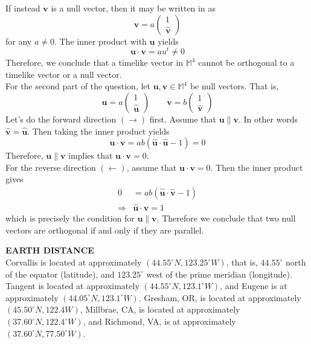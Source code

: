 \documentclass[a4paper, 11pt]{article}
\newcommand{\M}{\mathbb{M}}
\newcommand{\unit}[1]{\hat{\boldsymbol{#1}}}
\newcommand{\threevec}[2]{\begin{pmatrix} #1 \\ #2 \end{pmatrix}}
\newenvironment{solution}{%
	\begin{list}{}{%
			\setlength{\topsep}{0pt}%
			\setlength{\leftmargin}{0.5cm}%
			\setlength{\rightmargin}{0.5cm}%
			\setlength{\listparindent}{\parindent}%
			\setlength{\itemindent}{\parindent}%
			\setlength{\parsep}{\parskip}%
		}%
		\item[]}{\end{list}}
\begin{document}
\begin{enumerate}[leftmargin=0em, label=\textbf{\arabic*}]
\begin{solution}
      If instead $\mathbf{v}$ is a null vector, then it may be written in as
      \begin{equation}
        \mathbf{v} = a\threevec{1}{\unit{v}}
      \end{equation}
      for any $a\neq 0$. The inner product with $\mathbf{u}$ yields
      \begin{equation}
        \mathbf{u}\cdot\mathbf{v} = au^t \neq 0 
      \end{equation}
      Therefore, we conclude that a timelike vector in $\M^4$ cannot be
      orthogonal to a timelike vector or a null vector.\\

      For the second part of the question, let $\mathbf{u},\mathbf{v}\in \M^4$
      be null vectors. That is,
      \begin{equation}
        \mathbf{u}=a\threevec{1}{\unit{u}} \qquad \mathbf{v}= b\threevec{1}{\unit{v}}
      \end{equation}
      Let's do the forward direction $(\rightarrow)$ first. Assume that
      $\mathbf{u}\parallel\mathbf{v}$. In other words $\unit{v}=\unit{u}$. Then
      taking the inner product yields
      \begin{equation}
        \mathbf{u}\cdot\mathbf{v} = ab(\unit{u}\cdot\unit{u}-1) = 0 
      \end{equation}
     Therefore, $\mathbf{u}\parallel\mathbf{v}$  implies that
     $\mathbf{u}\cdot\mathbf{v}=0$.\\

     For the reverse direction $(\leftarrow)$, assume that
     $\mathbf{u}\cdot\mathbf{v}=0$. Then the inner product gives
     \begin{align}
       0 &= ab(\unit{u}\cdot\unit{v}-1) \\
       \Rightarrow &\unit{u}\cdot\unit{v} = 1 
     \end{align}
     which is precisely the condition for $\mathbf{u}\parallel\mathbf{v}$.
     Therefore we conclude that two null vectors are orthogonal if and only if
     they are parallel. 
        
      
    \end{solution}
    

  \item \textbf{EARTH DISTANCE}\\
    Corvallis is located at approximately $(44.55^\circ N, 123.25^\circ W)$,
    that is, $44.55^\circ$ north of the equator (latitude), and $123.25^\circ$
    west of the prime meridian (longitude). Tangent is located at approximately
    $(44.55^\circ N, 123.1^\circ W)$, and Eugene is at approximately
    $(44.05^\circ N, 123.1^\circ W)$. Gresham, OR, is located at approximately
    $(45.50^\circ N,122.4 W)$, Millbrae, CA, is located at approximately
    $(37.60^\circ N,122.4^\circ W)$, and Richmond, VA, is at approximately
    $(37.60^\circ N, 77.50^\circ W)$. \\


\end{enumerate}
\end{document}
